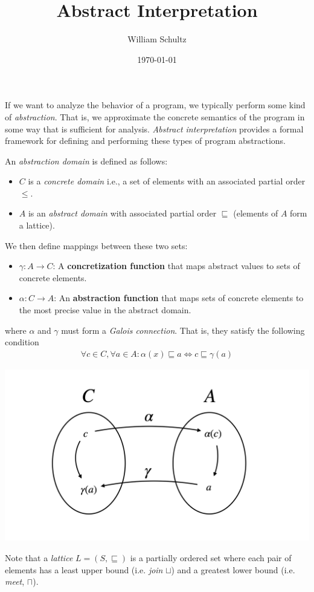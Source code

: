 \documentclass[10pt]{article}
\begin{document}
\title{Abstract Interpretation}
\author{William Schultz}
\date{\today}

\maketitle


If we want to analyze the behavior of a program, we typically perform some kind of \textit{abstraction}. That is, we approximate the concrete semantics of the program in some way that is sufficient for analysis. \textit{Abstract interpretation} provides a formal framework for defining and performing these types of program abstractions.

An \textit{abstraction domain} is defined as follows: 
\begin{itemize}
    \item $C$ is a \textit{concrete domain} i.e., a set of elements with an associated partial order $\leq$.
    \item $A$ is an \textit{abstract domain} with associated partial order $\sqsubseteq$ (elements of $A$ form a lattice).
\end{itemize}
We then define mappings between these two sets:
\begin{itemize}
    \item $\gamma : A \rightarrow C$: A \textbf{concretization function} that maps abstract values to sets of concrete elements.
    \item $\alpha : C \rightarrow A$: An \textbf{abstraction function} that maps sets of concrete elements to the most precise value in the abstract domain. 
\end{itemize}
where $\alpha$ and $\gamma$ must form a \textit{Galois connection}. That is, they satisfy the following condition
\begin{align*}
    \forall c \in C, \forall a \in A : \alpha(x) \sqsubseteq a \Leftrightarrow c \sqsubseteq \gamma(a) 
\end{align*} 
\begin{center}
    \includegraphics[scale=0.15]{diagrams/diagrams.001.png}
\end{center}
Note that a \textit{lattice} $L=(S,\sqsubseteq)$ is a partially ordered set where each pair of elements has a least upper bound (i.e. \textit{join} $\sqcup$) and a greatest lower bound (i.e. \textit{meet}, $\sqcap$).
\end{document}
